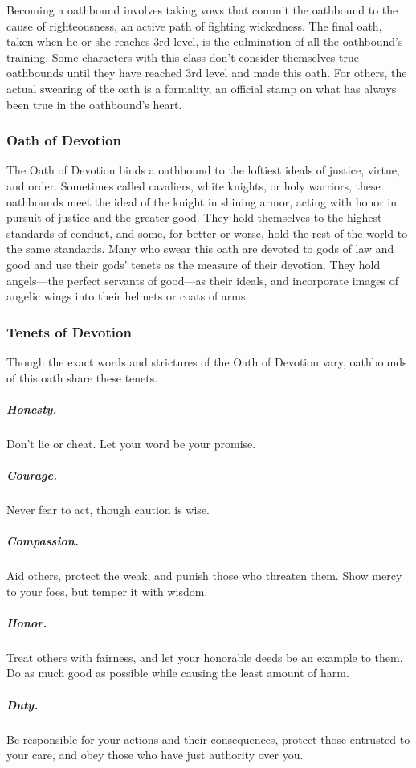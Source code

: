 Becoming a oathbound involves taking vows that commit the oathbound to the cause of righteousness, an active path of fighting wickedness. The final oath, taken when he or she reaches 3rd level, is the culmination of all the oathbound's training. Some characters with this class don't consider themselves true oathbounds until they have reached 3rd level and made this oath. For others, the actual swearing of the oath is a formality, an official stamp on what has always been true in the oathbound's heart.

\subsubsection{Oath of Devotion}

The Oath of Devotion binds a oathbound to the loftiest ideals of justice, virtue, and order. Sometimes called cavaliers, white knights, or holy warriors, these oathbounds meet the ideal of the knight in shining armor, acting with honor in pursuit of justice and the greater good. They hold themselves to the highest standards of conduct, and some, for better or worse, hold the rest of the world to the same standards. Many who swear this oath are devoted to gods of law and good and use their gods' tenets as the measure of their devotion. They hold angels—the perfect servants of good—as their ideals, and incorporate images of angelic wings into their helmets or coats of arms.

\subsubsection{Tenets of Devotion}

Though the exact words and strictures of the Oath of Devotion vary, oathbounds of this oath share these tenets.

\subparagraph*{Honesty.} Don't lie or cheat. Let your word be your promise.

\subparagraph*{Courage.} Never fear to act, though caution is wise.

\subparagraph*{Compassion.} Aid others, protect the weak, and punish those who threaten them. Show mercy to your foes, but temper it with wisdom.

\subparagraph*{Honor.} Treat others with fairness, and let your honorable deeds be an example to them. Do as much good as possible while causing the least amount of harm.

\subparagraph*{Duty.} Be responsible for your actions and their consequences, protect those entrusted to your care, and obey those who have just authority over you.                  

